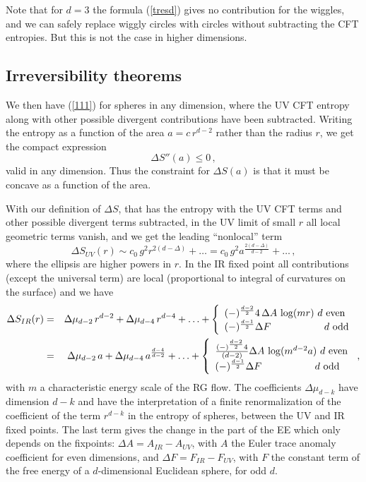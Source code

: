 \documentclass[11pt]{article}
\numberwithin{equation}{section}
\newcommand\eea{\end{eqnarray}}
\newcommand\bea{\begin{eqnarray}}
\newcommand{\be}{\begin{equation}}
\newcommand{\ee}{\end{equation}}
\begin{document}
Note that for $d=3$ the formula (\ref{tresd}) gives no contribution for the wiggles, and we can safely replace wiggly circles with circles without subtracting the CFT entropies. But this is not the case in higher dimensions. 
  

\subsection{Irreversibility theorems}


We then have (\ref{111}) for spheres in any dimension, where the UV CFT entropy along with other possible divergent contributions have been subtracted.
Writing the entropy as a function of the area $a=c \,r^{d-2}$ rather than the radius $r$, we get the compact expression
\be
\Delta S''(a)\le 0\,, \label{sisi}
\ee 
valid in any dimension. Thus the constraint for $\Delta S(a)$ is that it must be concave as a function of the area.

 With our definition of $\Delta S$, that has the entropy with the UV CFT terms and other possible divergent terms subtracted, in the UV limit of small $r$ all local geometric terms vanish, and we get the leading ``nonlocal'' term 
\be
\Delta S_{UV}(r) \sim  c_0 \,g^2 r^{2(d-\Delta)}+\ldots =c_0\, g^2 a^{\frac{2(d-\Delta)}{d-2}}+\ldots\,,\label{oyo1}
\ee
where the ellipsis are higher powers in $r$. In the IR fixed point all contributions (except the universal term) are local (proportional to integral of curvatures on the surface) and we have
\bea 
\Delta S_{IR}(r)&=&\Delta \mu_{d-2}\,r^{d-2}+\Delta \mu_{d-4}\, r^{d-4}+\ldots  + \left\lbrace \begin{array}{l} (-)^{\frac{d-2}{2}} 4\,\Delta A\, \log(m r)\,\, d \,\, \textrm{even}\\ (-)^{\frac{d-1}{2}} \Delta F \hspace{1.9cm}d\,\,\textrm{odd }  \end{array}\right.\,\nonumber\\
\label{even1}
&=&\Delta \mu_{d-2}\, a +\Delta \mu_{d-4}\, a^{\frac{d-4}{d-2}}+\ldots  
  + \left\lbrace \begin{array}{l} \frac{(-)^{\frac{d-2}{2}} 4}{(d-2)}\Delta A\, \log(m^{d-2}a)\,\, d \,\, \textrm{even}\\ (-)^{\frac{d-1}{2}} \Delta F \hspace{1.9cm}d\,\,\textrm{odd }  \end{array}\right.\,,
\eea
with $m$ a characteristic energy scale of the RG flow.    
The coefficients $\Delta \mu_{d-k}$ have dimension $d-k$ and have the interpretation of a finite renormalization of the coefficient of the term $r^{d-k}$ in the entropy of spheres,  between the UV and IR fixed points. The last term gives the change in the part of the EE which only depends on the fixpoints: $\Delta A=A_{IR}-A_{UV}$, with $A$ the Euler trace anomaly coefficient for even dimensions, and $\Delta F=F_{IR}-F_{UV}$, with $F$ the constant term of the free energy of a $d$-dimensional Euclidean sphere, for odd $d$. 
\end{document}
